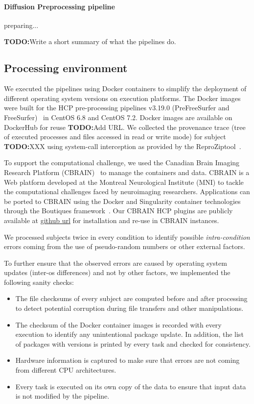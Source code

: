 \documentclass{article}
\newcommand{\todo}[1]{\color{red}\textbf{TODO:}#1\color{black}}
\newcommand{\reprozip}[0]{ReproZip}
\begin{document}
\paragraph{Diffusion Preprocessing pipeline} preparing...

\todo{Write a short summary of what the pipelines do.}

\subsection{Processing environment}

We executed the pipelines using Docker
containers to simplify the deployment of different operating
system versions on execution platforms. The Docker images were built for the HCP
 pre-processing pipelines v3.19.0 (PreFreeSurfer and
FreeSurfer)~\cite{Glasser2013} in CentOS 6.8 and CentOS 7.2. Docker images are available on DockerHub for reuse \todo{Add URL}. We
collected the provenance trace (tree of executed processes and files
accessed in read or write mode) for subject \todo{XXX} using system-call
interception as provided by the \reprozip tool~\cite{Chirigati2016}.



To support the computational challenge, we used the Canadian Brain
Imaging Research Platform (CBRAIN)~\cite{cbrain} to manage the
containers and data. CBRAIN is a Web platform developed at the
Montreal Neurological Institute (MNI) to tackle the computational
challenges faced by neuroimaging researchers.  Applications can be
ported to CBRAIN using the Docker and Singularity container
technologies through the Boutiques framework~\cite{boutiques}. Our
CBRAIN HCP plugins are publicly available at \url{github url} for
installation and re-use in CBRAIN instances.

We processed subjects twice in every condition to identify possible \emph{intra-condition} errors coming from the use of pseudo-random numbers or other external
factors. 

To further ensure that the observed errors are caused by operating system
updates (inter-os differences) and not by other factors, we
implemented the following sanity checks:
\begin{itemize}
\item The file checksums of every
subject are computed before and after processing to detect potential corruption during file transfers and other manipulations.
\item The checksum of the Docker container images is recorded with
  every execution to identify any unintentional package update. In
  addition, the list of packages with versions is printed by every
  task and checked for consistency.
\item Hardware information is captured to make sure that errors are
  not coming from different CPU architectures.
\item Every task is executed on its own copy of the data to ensure
  that input data is not modified by the pipeline. 
\end{itemize}
\end{document}
